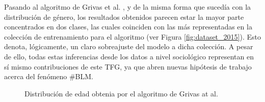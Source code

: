 \bigskip
Pasando al algoritmo de Grivas et al. \cite{grivas2015author}, y de la misma forma que sucedía con la distribución de género, los resultados obtenidos
parecen estar la mayor parte concentrados en dos clases, las cuales coinciden con las más representadas en la colección de entrenamiento para el algoritmo (ver Figura \ref{fig:dataset_2015}).
Esto denota, lógicamente, un claro sobreajuste del modelo a dicha colección. 
{\color{red}
A pesar de ello, todas estas inferencias desde los datos a nivel sociológico representan en sí mismo contribuciones de este TFG,
ya que abren nuevas hipótesis de trabajo acerca del fenómeno \#BLM.
}
\bigskip
\begin{figure}[H]
	\centering
	\caption{Distribución de edad obtenia por el algoritmo de Grivas at al. \cite{grivas2015author}}
	\label{fig:comparativa_edad_grivas}
\end{figure}


